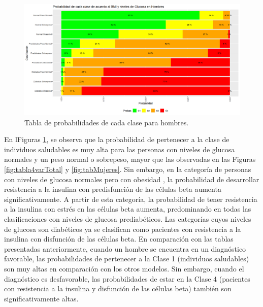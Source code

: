 \begin{figure}[H]
    \centering
    \includegraphics[height = 10 cm, width = 0.9 \textwidth]{4img/tablaH.png}
    \caption{Tabla de probabilidades de cada clase para hombres.}
    \label{fig:tabla4varHom}
\end{figure}

En lFiguras \ref{fig:tabla4varHom}, se observa que la probabilidad de pertenecer a la clase de individuos saludables es muy alta para las personas con niveles de glucosa normales y un peso normal o sobrepeso, mayor que las observadas en las Figuras \ref{fig:tabla4varTotal} y \ref{fig:tabMujeres}. Sin embargo, en la categoría de personas con niveles de glucosa normales pero con obesidad , la probabilidad de desarrollar resistencia a la insulina con predisfunción de las células beta aumenta significativamente. A partir de esta categoría, la probabilidad de tener resistencia a la insulina con estrés en las células beta aumenta, predominando en todas las clasificaciones con niveles de glucosa prediabéticos. Las categorías cuyos niveles de glucosa son diabéticos ya se clasifican como pacientes con resistencia a la insulina con disfunción de las células beta. En comparación con las tablas presentadas anteriormente, cuando un hombre se encuentra en un diagnóstico favorable, las probabilidades de pertenecer a la Clase 1 (individuos saludables) son muy altas en comparación con los otros modelos. Sin embargo, cuando el diagnóstico es desfavorable, las probabilidades de estar en la Clase 4 (pacientes con resistencia a la insulina y disfunción de las células beta) también son significativamente altas.

